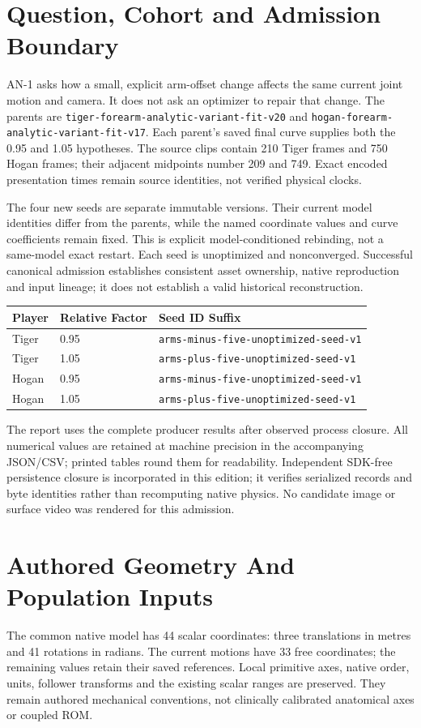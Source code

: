 \documentclass[11pt,letterpaper]{article}
\newcommand{\code}[1]{\nolinkurl{#1}}\newcommand{\hash}[1]{{\footnotesize\nolinkurl{#1}}}
\newcommand{\chapterpage}[1]{\clearpage\section{#1}}
\begin{document}
\section{Question, Cohort and Admission Boundary}
AN-1 asks how a small, explicit arm-offset change affects the same current joint motion and camera. It does not ask an optimizer to repair that change. The parents are \code{tiger-forearm-analytic-variant-fit-v20} and \code{hogan-forearm-analytic-variant-fit-v17}. Each parent's saved final curve supplies both the 0.95 and 1.05 hypotheses. The source clips contain 210 Tiger frames and 750 Hogan frames; their adjacent midpoints number 209 and 749. Exact encoded presentation times remain source identities, not verified physical clocks.

The four new seeds are separate immutable versions. Their current model identities differ from the parents, while the named coordinate values and curve coefficients remain fixed. This is explicit model-conditioned rebinding, not a same-model exact restart. Each seed is unoptimized and nonconverged. Successful canonical admission establishes consistent asset ownership, native reproduction and input lineage; it does not establish a valid historical reconstruction.

\begin{tabular}{@{}lll@{}}\toprule
Player & Relative Factor & Seed ID Suffix\\\midrule
Tiger & 0.95 & \code{arms-minus-five-unoptimized-seed-v1}\\
Tiger & 1.05 & \code{arms-plus-five-unoptimized-seed-v1}\\
Hogan & 0.95 & \code{arms-minus-five-unoptimized-seed-v1}\\
Hogan & 1.05 & \code{arms-plus-five-unoptimized-seed-v1}\\\bottomrule
\end{tabular}

The report uses the complete producer results after observed process closure. All numerical values are retained at machine precision in the accompanying JSON/CSV; printed tables round them for readability. Independent SDK-free persistence closure is incorporated in this edition; it verifies serialized records and byte identities rather than recomputing native physics. No candidate image or surface video was rendered for this admission.

\chapterpage{Authored Geometry And Population Inputs}
The common native model has 44 scalar coordinates: three translations in metres and 41 rotations in radians. The current motions have 33 free coordinates; the remaining values retain their saved references. Local primitive axes, native order, units, follower transforms and the existing scalar ranges are preserved. They remain authored mechanical conventions, not clinically calibrated anatomical axes or coupled ROM.
\end{document}
